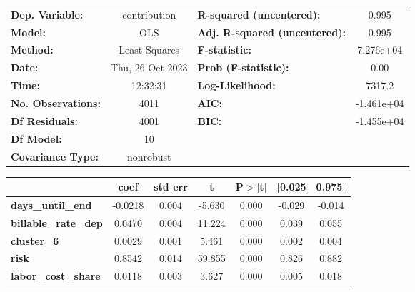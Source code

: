 \begin{center}
\begin{tabular}{lclc}
\toprule
\textbf{Dep. Variable:}      &   contribution   & \textbf{  R-squared (uncentered):}      &     0.995   \\
\textbf{Model:}              &       OLS        & \textbf{  Adj. R-squared (uncentered):} &     0.995   \\
\textbf{Method:}             &  Least Squares   & \textbf{  F-statistic:       }          & 7.276e+04   \\
\textbf{Date:}               & Thu, 26 Oct 2023 & \textbf{  Prob (F-statistic):}          &     0.00    \\
\textbf{Time:}               &     12:32:31     & \textbf{  Log-Likelihood:    }          &    7317.2   \\
\textbf{No. Observations:}   &        4011      & \textbf{  AIC:               }          & -1.461e+04  \\
\textbf{Df Residuals:}       &        4001      & \textbf{  BIC:               }          & -1.455e+04  \\
\textbf{Df Model:}           &          10      & \textbf{                     }          &             \\
\textbf{Covariance Type:}    &    nonrobust     & \textbf{                     }          &             \\
\bottomrule
\end{tabular}
\begin{tabular}{lcccccc}
                             & \textbf{coef} & \textbf{std err} & \textbf{t} & \textbf{P$> |$t$|$} & \textbf{[0.025} & \textbf{0.975]}  \\
\midrule
\textbf{days\_until\_end}    &      -0.0218  &        0.004     &    -5.630  &         0.000        &       -0.029    &       -0.014     \\
\textbf{billable\_rate\_dep} &       0.0470  &        0.004     &    11.224  &         0.000        &        0.039    &        0.055     \\
\textbf{cluster\_6}          &       0.0029  &        0.001     &     5.461  &         0.000        &        0.002    &        0.004     \\
\textbf{risk}                &       0.8542  &        0.014     &    59.855  &         0.000        &        0.826    &        0.882     \\
\textbf{labor\_cost\_share}  &       0.0118  &        0.003     &     3.627  &         0.000        &        0.005    &        0.018     \\

\end{tabular}
\end{center}
